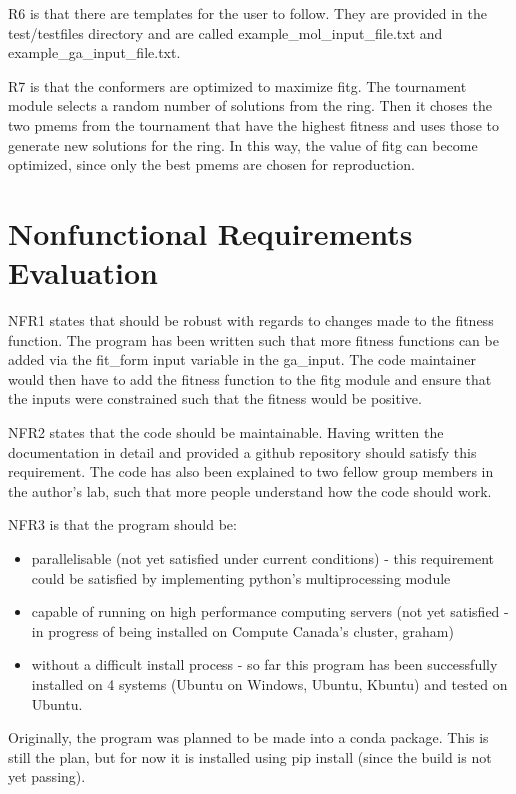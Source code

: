 \documentclass[12pt, titlepage]{article}
\begin{document}
R6 is that there are templates for the user to follow. They are provided in the 
test/testfiles directory and are called example\_mol\_input\_file.txt and 
example\_ga\_input\_file.txt.

R7 is that the conformers are optimized to maximize fitg. The tournament module 
selects a random number of solutions from the ring. Then it choses the two 
pmems from the tournament that have the highest fitness and uses those to 
generate new solutions for the ring. In this way, the value of fitg can become 
optimized, since only the best pmems are chosen for reproduction.

\section{Nonfunctional Requirements Evaluation}

NFR1 states that \progname{} should be robust with regards to changes made to 
the fitness function. The program has been written such that more fitness 
functions can be added via the fit\_form input variable in the ga\_input. The 
code maintainer would then have to add the fitness function to the fitg module 
and ensure that the inputs were constrained such that the fitness would be 
positive.

NFR2 states that the code should be maintainable. Having written the 
documentation in detail and provided a github repository should satisfy this 
requirement. The code has also been explained to two fellow group members in 
the author's lab, such that more people understand how the code should work.

NFR3 is that the program should be:
\begin{itemize}
	\item parallelisable (not yet satisfied under current conditions) - this 
	requirement could be satisfied by implementing python's multiprocessing 
	module
	\item capable of running on high performance computing servers (not yet 
	satisfied - in progress of being installed on Compute Canada's cluster, 
	graham)
	\item without a difficult install process - so far this program has been 
	successfully installed on 4 systems (Ubuntu on Windows, Ubuntu, Kbuntu) and 
	tested on Ubuntu.
\end{itemize}

Originally, the program was planned to be made into a conda package. This is 
still the plan, but for now it is installed using pip install (since the build 
is not yet passing).
\end{document}

